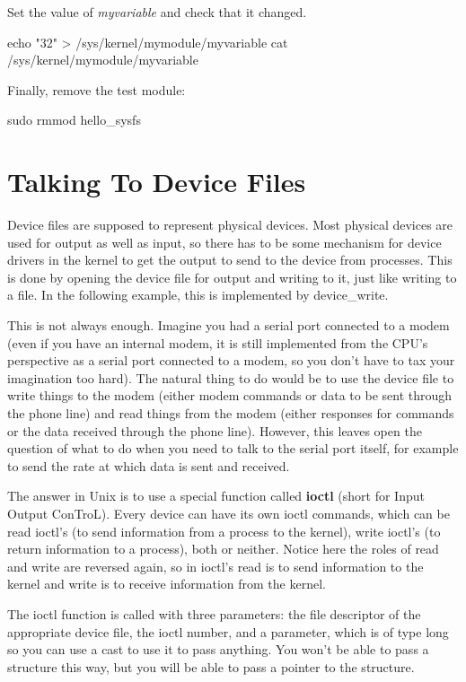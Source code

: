 \documentclass[10pt, oneside]{book}
\begin{document}
Set the value of \emph{myvariable} and check that it changed.

\begin{codebash}
echo "32" > /sys/kernel/mymodule/myvariable
cat /sys/kernel/mymodule/myvariable
\end{codebash}

Finally, remove the test module:

\begin{codebash}
sudo rmmod hello_sysfs
\end{codebash}

\section{Talking To Device Files}
\label{sec:org4566b36}
Device files are supposed to represent physical devices. Most physical devices are used for output as well as input, so there has to be some mechanism for device drivers in the kernel to get the output to send to the device from processes. This is done by opening the device file for output and writing to it, just like writing to a file. In the following example, this is implemented by device\_write.

This is not always enough. Imagine you had a serial port connected to a modem (even if you have an internal modem, it is still implemented from the CPU's perspective as a serial port connected to a modem, so you don't have to tax your imagination too hard). The natural thing to do would be to use the device file to write things to the modem (either modem commands or data to be sent through the phone line) and read things from the modem (either responses for commands or the data received through the phone line). However, this leaves open the question of what to do when you need to talk to the serial port itself, for example to send the rate at which data is sent and received.

The answer in Unix is to use a special function called \textbf{ioctl} (short for Input Output ConTroL). Every device can have its own ioctl commands, which can be read ioctl's (to send information from a process to the kernel), write ioctl's (to return information to a process), both or neither. Notice here the roles of read and write are reversed again, so in ioctl's read is to send information to the kernel and write is to receive information from the kernel.

The ioctl function is called with three parameters: the file descriptor of the appropriate device file, the ioctl number, and a parameter, which is of type long so you can use a cast to use it to pass anything. You won't be able to pass a structure this way, but you will be able to pass a pointer to the structure.
\end{document}
